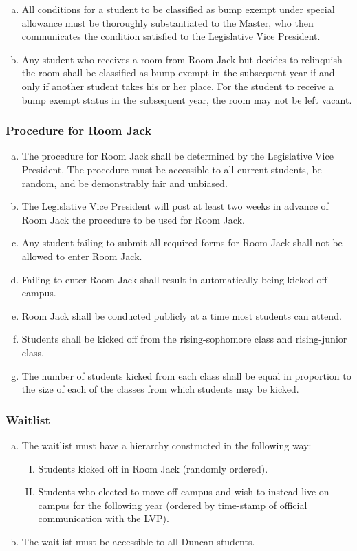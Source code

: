 \documentclass[USletter,12pt]{article}
\begin{document}
\begin{enumerate}[(a)]
\begin{enumerate}[(a)]
\begin{enumerate}[(I)]
	\end{enumerate}
\item All conditions for a student to be classified as bump exempt under special allowance must be thoroughly substantiated to the Master, who then communicates the condition satisfied to the Legislative Vice President.
\item Any student who receives a room from Room Jack but decides to relinquish the room shall be classified as bump exempt in the subsequent year if and only if another student takes his or her place.  For the student to receive a bump exempt status in the subsequent year, the room may not be left vacant.
\end{enumerate}

\subsubsection{Procedure for Room Jack}
\begin{enumerate}[(a)]
\item The procedure for Room Jack shall be determined by the Legislative Vice President.  The procedure must be accessible to all current students, be random, and be demonstrably fair and unbiased.
\item The Legislative Vice President will post at least two weeks in advance of Room Jack the procedure to be used for Room Jack.
\item Any student failing to submit all required forms for Room Jack shall not be allowed to enter Room Jack.
\item Failing to enter Room Jack shall result in automatically being kicked off campus.
\item Room Jack shall be conducted publicly at a time most students can attend.
\item Students shall be kicked off from the rising-sophomore class and rising-junior class.
\item The number of students kicked from each class shall be equal in proportion to the size of each of the classes from which students may be kicked.
\end{enumerate}

\subsubsection{Waitlist}
\begin{enumerate}[(a)]
\item The waitlist must have a hierarchy constructed in the following way:
	\begin{enumerate}[(I)]
	\item Students kicked off in Room Jack (randomly ordered).
	\item Students who elected to move off campus and wish to instead live on campus for the following year (ordered by time-stamp of official communication with the LVP).
	\end{enumerate}
\item  The waitlist must be accessible to all Duncan students.
\end{enumerate}



\end{enumerate}
\end{document}
